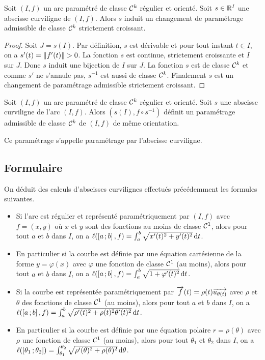 \begin{theo}
  Soit $(I,f)$ un arc paramétré de classe $\mathcal{C}^{k}$ régulier et orienté. Soit $s \in \mathbb{R}^I$ une abscisse curviligne de $(I, f)$. Alors $s$ induit un changement de paramétrage admissible de classe $\mathcal{C}^{k}$ strictement croissant.
\end{theo}
\begin{proof}
  Soit $J=s(I)$. Par définition, $s$ est dérivable et pour tout instant $t \in I$, on a $s'(t)=\left\lVert f'(t)\right\rVert>0$. La fonction $s$ est continue, strictement croissante et $I$ sur $J$. Donc $s$ induit une bijection de $I$ sur $J$. La fonction $s$ est de classe $\mathcal{C}^{k}$ et comme $s'$ ne s'annule pas, $s^{-1}$ est aussi de classe $\mathcal{C}^{k}$. Finalement $s$ est un changement de paramétrage admissible strictement croissant.
\end{proof}

\begin{corth}
  Soit $(I,f)$ un arc paramétré de classe $\mathcal{C}^{k}$ régulier et orienté. Soit $s$ une abscisse curviligne de l'arc $(I,f)$. Alors $(s(I), f\circ s^{-1})$ définit un paramétrage admissible de classe $\mathcal{C}^{k}$ de $(I, f)$ de même orientation. 

Ce paramétrage s'appelle paramétrage par l'abscisse curviligne.
\end{corth}

\subsection{Formulaire}

On déduit des calculs d'abscisses curvilignes effectués précédemment les formules suivantes.
\begin{itemize}
\item Si l'arc est régulier et représenté paramétriquement par $(I, f)$ avec $f=(x,y)$ où $x$ et $y$ sont des fonctions au moins de classe $\mathcal{C}^{1}$, alors pour tout $a$ et $b$ dans $I$, on a $\ell(\left[ a \, ;  b \right],f)=\int_a^b\sqrt{x'(t)^2+y'(t)^2}\mathop{}\mathopen{}\mathrm{d} t$.
\item En particulier si la courbe est définie par une équation cartésienne de la forme $y=\varphi(x)$ avec $\varphi$ une fonction de classe $\mathcal{C}^{1}$ (au moins), alors pour tout $a$ et $b$ dans $I$, on a $\ell(\left[ a \, ;  b \right],f)=\int_a^b\sqrt{1+\varphi'(t)^2}\mathop{}\mathopen{}\mathrm{d} t$.
\item Si la courbe est représentée paramétriquement par $\overrightarrow{f}(t)=\rho(t)\overrightarrow{u_{\theta(t)}}$ avec $\rho$ et $\theta$ des fonctions de classe $\mathcal{C}^{1}$ (au moins), alors pour tout $a$ et $b$ dans $I$, on a $\ell(\left[ a \, ;  b \right],f)=\int_a^b\sqrt{\rho'(t)^2+\rho(t)^2\theta'(t)^2}\mathop{}\mathopen{}\mathrm{d} t$.
\item En particulier si la courbe est définie par une équation polaire $r=\rho(\theta)$ avec $\rho$ une fonction de classe $\mathcal{C}^{1}$ (au moins), alors pour tout $\theta_1$ et $\theta_2$ dans $I$, on a $\ell(\left[ \theta_1 \, ;  \theta_2 \right])=\int_{\theta_1}^{\theta_2}\sqrt{\rho'(\theta)^2+\rho(\theta)^2}\mathop{}\mathopen{}\mathrm{d} \theta$.
\end{itemize}

